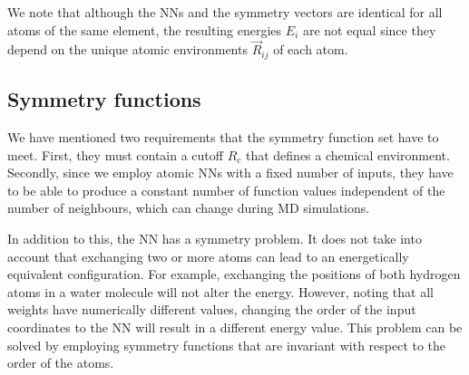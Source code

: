 \documentclass[twoside,english]{uiofysmaster}
\begin{document}
We note that although the NNs and the symmetry vectors
are identical for all atoms of the same element, the resulting energies $E_i$ are not equal since 
they depend on the unique atomic environments $\vec{R}_{ij}$ of each atom. 




\subsection{Symmetry functions} \label{sec:symmetryFunctions}
We have mentioned two requirements that the symmetry function set have to meet. First, they must contain a cutoff $R_c$
that defines a chemical environment. Secondly, since we employ atomic NNs with a fixed number of inputs,
they have to be able to produce a constant 
number of function values independent of the number of neighbours, which can change during MD simulations. 

In addition to this, the NN has a symmetry problem. It does not take into account that exchanging two or more atoms
can lead to an energetically equivalent configuration. For example, exchanging the positions of both hydrogen atoms
in a water molecule will not alter the energy. However, noting that all weights have numerically different values,
changing the order of the input coordinates to the NN will result in a different energy value. This problem can be solved
by employing symmetry functions that are invariant with respect to the order of the atoms.  
\end{document}
